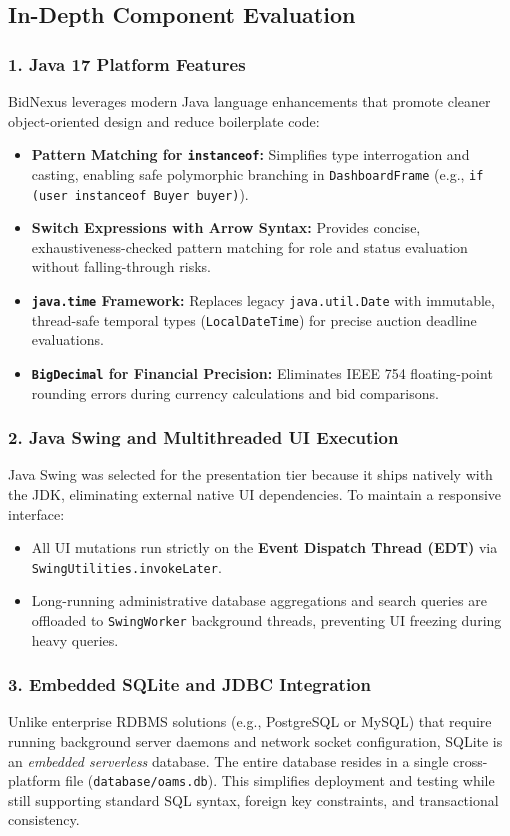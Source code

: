 \subsection{In-Depth Component Evaluation}

\subsubsection{1. Java 17 Platform Features}
BidNexus leverages modern Java language enhancements that promote cleaner object-oriented design and reduce boilerplate code:
\begin{itemize}
    \item \textbf{Pattern Matching for \texttt{instanceof}:} Simplifies type interrogation and casting, enabling safe polymorphic branching in \texttt{DashboardFrame} (e.g., \texttt{if (user instanceof Buyer buyer)}).
    \item \textbf{Switch Expressions with Arrow Syntax:} Provides concise, exhaustiveness-checked pattern matching for role and status evaluation without falling-through risks.
    \item \textbf{\texttt{java.time} Framework:} Replaces legacy \texttt{java.util.Date} with immutable, thread-safe temporal types (\texttt{LocalDateTime}) for precise auction deadline evaluations.
    \item \textbf{\texttt{BigDecimal} for Financial Precision:} Eliminates IEEE 754 floating-point rounding errors during currency calculations and bid comparisons.
\end{itemize}

\subsubsection{2. Java Swing and Multithreaded UI Execution}
Java Swing was selected for the presentation tier because it ships natively with the JDK, eliminating external native UI dependencies. To maintain a responsive interface:
\begin{itemize}
    \item All UI mutations run strictly on the \textbf{Event Dispatch Thread (EDT)} via \texttt{SwingUtilities.invokeLater}.
    \item Long-running administrative database aggregations and search queries are offloaded to \texttt{SwingWorker} background threads, preventing UI freezing during heavy queries.
\end{itemize}

\subsubsection{3. Embedded SQLite and JDBC Integration}
Unlike enterprise RDBMS solutions (e.g., PostgreSQL or MySQL) that require running background server daemons and network socket configuration, SQLite is an \textit{embedded serverless} database. The entire database resides in a single cross-platform file (\texttt{database/oams.db}). This simplifies deployment and testing while still supporting standard SQL syntax, foreign key constraints, and transactional consistency.

